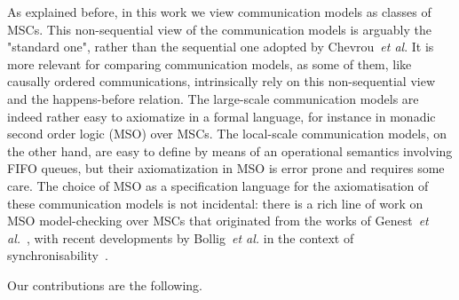 As explained before, in this work we view communication models as classes of MSCs.
This non-sequential view of the communication models is arguably the "standard one",
rather than the sequential one adopted by Chevrou~\emph{et al}. It is more relevant for comparing communication models, as some
of them, like causally ordered communications, intrinsically rely on this non-sequential view and the happens-before relation. The
large-scale communication models are indeed rather easy to axiomatize in a formal language, for instance in monadic second order logic (MSO) over MSCs. The local-scale
communication models, on the other hand, are easy to define by means of an operational semantics involving FIFO queues, but their axiomatization
in MSO is error prone and requires some care. The choice of MSO as a specification language for the axiomatisation of
these communication models is not incidental: there is a rich line of work on MSO model-checking over MSCs that originated from
the works of Genest~\emph{et al.}~\cite{genest2004kleene,GKM07}, with recent developments by Bollig~\emph{et al.} in the context
of synchronisability~\cite{DBLP:conf/concur/BolligGFLLS21}.

Our contributions are the following.

